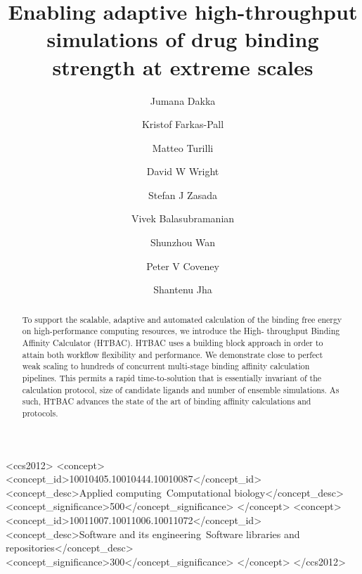 \documentclass[manuscript, review, screen]{acmart}
\begin{document}
\title{Enabling adaptive high-throughput simulations of drug binding strength at extreme scales} 

\author{Jumana Dakka}
\orcid{}
\affiliation{%
  \institution{}
  \streetaddress{}
  \city{}
  \state{}
  \postcode{}
  \country{}}
\email{}
\author{Kristof Farkas-Pall}
\orcid{}
\email{}
\author{Matteo Turilli}
\orcid{}
\affiliation{%
  \institution{}
  \city{}
  \country{}
}
\email{}
\author{David W Wright}
\author{Stefan J Zasada}
\orcid{}
\email{}
\author{Vivek Balasubramanian}
\orcid{}
\affiliation{%
  \institution{}
  \city{}
  \country{}
}
\email{}
\author{Shunzhou Wan}
\orcid{}
\email{}
\author{Peter V Coveney}
\orcid{}
\email{}
\author{Shantenu Jha}
\orcid{}
\affiliation{%
  \institution{}
  \city{}
  \country{}
}
\email{}


\renewcommand\shortauthors{Dakka, J. et al}

\begin{abstract}
To support the scalable, adaptive and automated calculation of the binding
free energy on high-performance computing resources, we introduce the High-
throughput Binding Affinity Calculator (HTBAC). HTBAC uses a building block
approach in order to attain both workflow flexibility and
performance. We demonstrate close to perfect weak scaling to hundreds of
concurrent multi-stage binding affinity calculation pipelines. This permits
a rapid time-to-solution that is essentially invariant of the calculation
protocol, size of candidate ligands and number of ensemble simulations. As
such, HTBAC advances the state of the art of binding affinity calculations and
protocols.

\end{abstract}


%
%
\begin{CCSXML}
<ccs2012>
<concept>
<concept_id>10010405.10010444.10010087</concept_id>
<concept_desc>Applied computing~Computational biology</concept_desc>
<concept_significance>500</concept_significance>
</concept>
<concept>
<concept_id>10011007.10011006.10011072</concept_id>
<concept_desc>Software and its engineering~Software libraries and repositories</concept_desc>
<concept_significance>300</concept_significance>
</concept>
</ccs2012>
\end{CCSXML}
\end{document}
